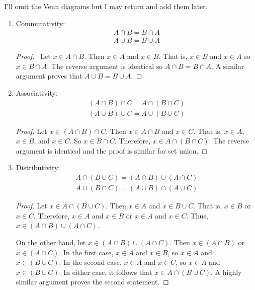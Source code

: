 \documentclass[class=report, crop=false]{standalone}
\begin{document}
  \begin{solution}
    I'll omit the Venn diagrams but I may return and add them later.
    \begin{enumerate}[label=({\alph*})]
      \item Commutativity:
      \begin{gather*}
        A \cap B = B \cap A \\
        A \cup B = B \cup A
      \end{gather*}

      \begin{proof}\
        Let \(x \in A \cap B\). Then \(x \in A\) and \(x \in B\). That is, \(x \in B\) and \(x \in A\) so \(x \in B \cap A\).
        The reverse argument is identical so \(A \cap B = B \cap A\). A similar argument proves that \(A \cup B = B \cup A\).
      \end{proof}

      \item Associativity:
      \begin{gather*}
        (A \cap B) \cap C = A \cap (B \cap C) \\
        (A \cup B) \cup C = A \cup (B \cup C)
      \end{gather*}

      \begin{proof}
        Let \(x \in (A \cap B) \cap C\). Then \(x \in A \cap B\) and \(x \in C\). That is, \(x \in A\), \(x \in B\), and \(x \in C\). So \(x \in B \cap C\). Therefore, \(x \in A \cap (B \cap C)\).
        The reverse argument is identical and the proof is similar for set union.
      \end{proof}

      \item Distributivity:
      \begin{gather*}
        A \cap (B \cup C) = (A \cap B) \cup (A \cap C) \\
        A \cup (B \cap C) = (A \cup B) \cap (A \cup C)
      \end{gather*}

      \begin{proof}
        Let \(x \in A \cap (B \cup C)\). Then \(x \in A\) and \(x \in B \cup C\). That is, \(x \in B\) or \(x \in C\).
        Therefore, \(x \in A\) and \(x \in B\) or \(x \in A\) and \(x \in C\). Thus, \(x \in (A \cap B) \cup (A \cap C)\).

        On the other hand, let \(x \in (A \cap B) \cup (A \cap C)\). Then \(x \in (A \cap B)\) or \(x \in (A \cap C)\).
        In the first case, \(x \in A\) and \(x \in B\), so \(x \in A\) and \(x \in (B \cup C)\). In the second case, \(x \in A\) and \(x \in C\), so \(x \in A\) and \(x \in (B \cup C)\).
        In either case, it follows that \(x \in A \cap (B \cup C)\). A highly similar argument proves the second statement.
      \end{proof}


\end{enumerate}
\end{solution}
\end{document}
